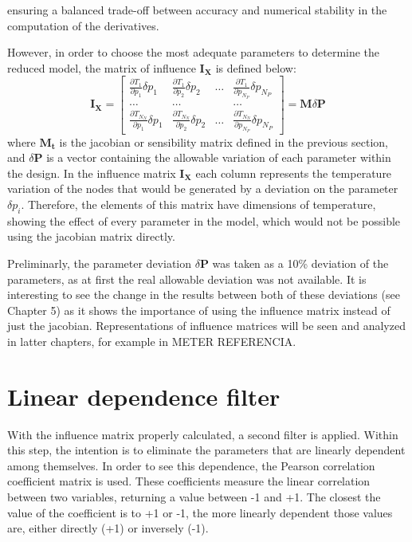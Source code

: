  ensuring a balanced trade-off between accuracy and numerical stability in the computation of the derivatives.

However, in order to choose the most adequate parameters to determine the reduced model, the matrix of influence $\mathbf{I}_{\mathbf{X}}$ is defined below:
\begin{equation}
\mathbf{I}_{\mathbf{X}}=\left[\begin{array}{cccc}
\frac{\partial T_1}{\partial p_1} \delta p_1 & \frac{\partial T_1}{\partial p_2} \delta p_2 & \ldots & \frac{\partial T_1}{\partial p_{N_P}} \delta p_{N_P} \\
\ldots & \ldots & & \ldots \\
\frac{\partial T_{N_N}}{\partial p_1} \delta p_1 & \frac{\partial T_{N_N}}{\partial p_2} \delta p_2 & \ldots & \frac{\partial T_{N_N}}{\partial p_{N_P}} \delta p_{N_P}
\end{array}\right]=\mathbf{M} \delta \boldsymbol{P}
\end{equation}
where $\mathbf{M_t}$ is the jacobian or sensibility matrix defined in the previous section, and $ \delta \boldsymbol{P}$ is a vector containing the allowable variation of each parameter within the design. In the influence matrix $\mathbf{I}_{\mathbf{X}}$ each column represents the temperature variation of the nodes that would be generated by a deviation on the parameter $ \delta p_i$. Therefore, the elements of this matrix have dimensions of temperature, showing the effect of every parameter in the model, which would not be possible using the jacobian matrix directly.

Preliminarly,  the parameter deviation $ \delta \boldsymbol{P}$ was taken as a 10\% deviation of the parameters, as at first the real allowable deviation was not available. It is interesting to see the change in the results between both of these deviations (see Chapter 5) as it shows the importance of using the influence matrix instead of just the jacobian. Representations of influence matrices will be seen and analyzed in latter chapters, for example in METER REFERENCIA.


 \section{Linear dependence filter}\label{s:ldfilter}
With the influence matrix properly calculated, a second filter is applied. Within this step, the intention is to eliminate the parameters that are linearly dependent among themselves. In order to see this dependence, the Pearson correlation coefficient matrix is used. These coefficients measure the linear correlation between two variables, returning a value between -1 and +1. The closest the value of the coefficient is to +1 or -1, the more linearly dependent those values are, either directly (+1) or inversely (-1).

